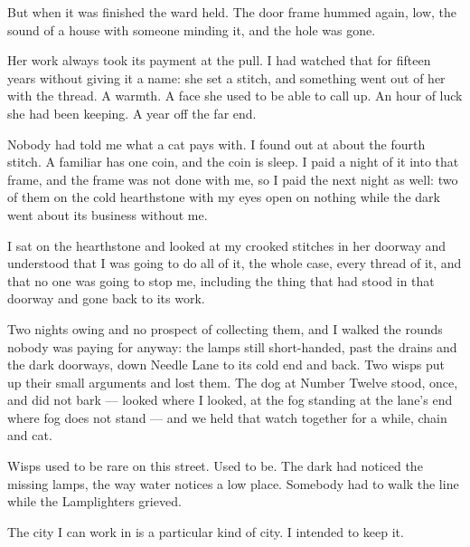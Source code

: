 But when it was finished the ward held. The door frame hummed again, low, the sound of a house with someone minding it, and the hole was gone.

Her work always took its payment at the pull. I had watched that for fifteen years without giving it a name: she set a stitch, and something went out of her with the thread. A warmth. A face she used to be able to call up. An hour of luck she had been keeping. A year off the far end.

Nobody had told me what a cat pays with. I found out at about the fourth stitch. A familiar has one coin, and the coin is sleep. I paid a night of it into that frame, and the frame was not done with me, so I paid the next night as well: two of them on the cold hearthstone with my eyes open on nothing while the dark went about its business without me.

I sat on the hearthstone and looked at my crooked stitches in her doorway and understood that I was going to do all of it, the whole case, every thread of it, and that no one was going to stop me, including the thing that had stood in that doorway and gone back to its work.

\scenebreak

Two nights owing and no prospect of collecting them, and I walked the rounds nobody was paying for anyway: the lamps still short-handed, past the drains and the dark doorways, down Needle Lane to its cold end and back. Two wisps put up their small arguments and lost them. The dog at Number Twelve stood, once, and did not bark --- looked where I looked, at the fog standing at the lane's end where fog does not stand --- and we held that watch together for a while, chain and cat.

Wisps used to be rare on this street. Used to be. The dark had noticed the missing lamps, the way water notices a low place. Somebody had to walk the line while the Lamplighters grieved.

The city I can work in is a particular kind of city. I intended to keep it.
